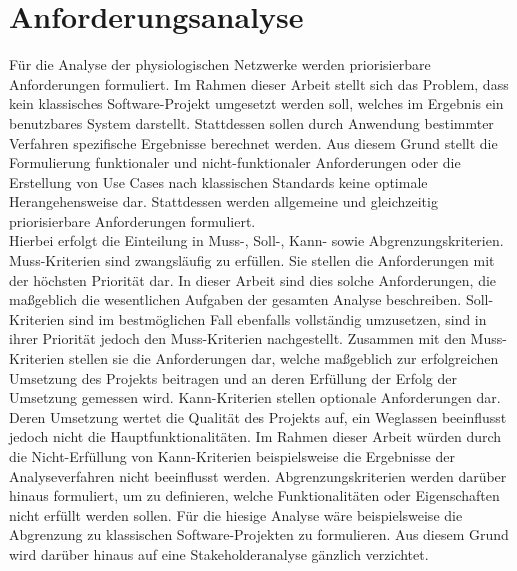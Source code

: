 


\section{Anforderungsanalyse}

Für die Analyse der physiologischen Netzwerke werden priorisierbare Anforderungen formuliert. Im Rahmen dieser Arbeit stellt sich das Problem, dass kein klassisches Software-Projekt umgesetzt werden soll, welches im Ergebnis ein benutzbares System darstellt. Stattdessen sollen durch Anwendung bestimmter Verfahren spezifische Ergebnisse berechnet werden. Aus diesem Grund stellt die Formulierung funktionaler und nicht-funktionaler Anforderungen oder die Erstellung von Use Cases nach klassischen Standards keine optimale Herangehensweise dar. Stattdessen werden allgemeine und gleichzeitig priorisierbare Anforderungen formuliert.\\

Hierbei erfolgt die Einteilung in Muss-, Soll-, Kann- sowie Abgrenzungskriterien. Muss-Kriterien sind zwangsläufig zu erfüllen. Sie stellen die Anforderungen mit der höchsten Priorität dar. In dieser Arbeit sind dies solche Anforderungen, die maßgeblich die wesentlichen Aufgaben der gesamten Analyse beschreiben. Soll-Kriterien sind im bestmöglichen Fall ebenfalls vollständig umzusetzen, sind in ihrer Priorität jedoch den Muss-Kriterien nachgestellt. Zusammen mit den Muss-Kriterien stellen sie die Anforderungen dar, welche maßgeblich zur erfolgreichen Umsetzung des Projekts beitragen und an deren Erfüllung der Erfolg der Umsetzung gemessen wird. Kann-Kriterien stellen optionale Anforderungen dar. Deren Umsetzung wertet die Qualität des Projekts auf, ein Weglassen beeinflusst jedoch nicht die Hauptfunktionalitäten. Im Rahmen dieser Arbeit würden durch die Nicht-Erfüllung von Kann-Kriterien beispielsweise die Ergebnisse der Analyseverfahren nicht beeinflusst werden. Abgrenzungskriterien werden darüber hinaus formuliert, um zu definieren, welche Funktionalitäten oder Eigenschaften nicht erfüllt werden sollen. Für die hiesige Analyse wäre beispielsweise die Abgrenzung zu klassischen Software-Projekten zu formulieren. Aus diesem Grund wird darüber hinaus auf eine Stakeholderanalyse gänzlich verzichtet.\\

